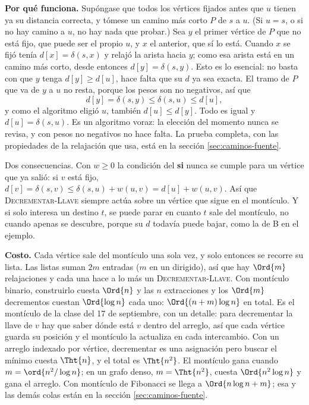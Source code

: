 \documentclass[11pt,letterpaper]{article}
\begin{document}
\textbf{Por qué funciona.} Supóngase que todos los vértices fijados
antes que $u$ tienen ya su distancia correcta, y tómese un camino más
corto $P$ de $s$ a $u$. (Si $u = s$, o si no hay camino a $u$, no hay
nada que probar.) Sea $y$ el primer vértice de $P$ que no está fijo,
que puede ser el propio $u$, y $x$ el anterior, que sí lo está. Cuando
$x$ se fijó tenía $d[x] = \delta(s, x)$ y relajó la arista hacia $y$;
como esa arista está en un camino más corto, desde entonces
$d[y] = \delta(s, y)$. Esto es lo esencial: no basta con que $y$ tenga
$d[y] \geq d[u]$, hace falta que su $d$ ya sea exacta. El tramo de $P$
que va de $y$ a $u$ no resta, porque los pesos son no negativos, así
que
\[
  d[y] = \delta(s, y) \leq \delta(s, u) \leq d[u] ,
\]
y como el algoritmo eligió $u$, también $d[u] \leq d[y]$. Todo es
igual y $d[u] = \delta(s, u)$. Es un algoritmo voraz: la elección del
momento nunca se revisa, y con pesos no negativos no hace falta. La
prueba completa, con las propiedades de la relajación que usa, está en
la sección \ref{sec:caminos-fuente}.

Dos consecuencias. Con $w \geq 0$ la condición del \textbf{si} nunca
se cumple para un vértice que ya salió: si $v$ está fijo,
$d[v] = \delta(s, v) \leq \delta(s, u) + w(u, v) = d[u] + w(u, v)$.
Así que \textsc{Decrementar-Llave} siempre actúa sobre un vértice que
sigue en el montículo. Y si solo interesa un destino $t$, se puede
parar en cuanto $t$ sale del montículo, no cuando apenas se descubre,
porque su $d$ todavía puede bajar, como la de B en el ejemplo.

\textbf{Costo.} Cada vértice sale del montículo una sola vez, y solo
entonces se recorre su lista. Las listas suman $2m$ entradas ($m$ en
un dirigido), así que hay $\Ord{m}$ relajaciones y cada una hace a lo
más un \textsc{Decrementar-Llave}. Con montículo binario, construirlo
cuesta $\Ord{n}$ y las $n$ extracciones y los $\Ord{m}$ decrementos
cuestan $\Ord{\log n}$ cada uno: $\Ord{(n + m) \log n}$ en total. Es
el montículo de la clase del 17 de septiembre, con un detalle: para
decrementar la llave de $v$ hay que saber dónde está $v$ dentro del
arreglo, así que cada vértice guarda su posición y el montículo la
actualiza en cada intercambio. Con un arreglo indexado por vértice,
decrementar es una asignación pero buscar el mínimo cuesta $\Tht{n}$,
y el total es $\Tht{n^2}$. El montículo gana cuando
$m = \ord{n^2 / \log n}$; en un grafo denso, $m = \Tht{n^2}$, cuesta
$\Ord{n^2 \log n}$ y gana el arreglo. Con montículo de Fibonacci se
llega a $\Ord{n \log n + m}$; esa y las demás colas están en la
sección \ref{sec:caminos-fuente}.
\end{document}
